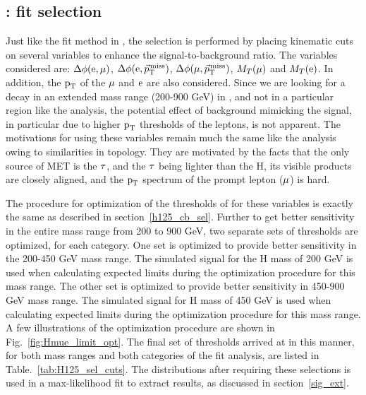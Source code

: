 \subsection{\Hmue: \mcol fit selection}
\label{H125_cb_sel}
 Just like the \mcol fit method in \hmue, the selection is performed by placing kinematic cuts on several variables to enhance the signal-to-background ratio. The variables considered are: $\Delta\phi(\text{e}, \mu)$, $\Delta\phi(\text{e}, {\vec p}_{\mathrm{T}}^{\kern1pt\text{miss}})$, $\Delta\phi(\mu, {\vec p}_{\mathrm{T}}^{\kern1pt\text{miss}})$, $M_T(\mu)$ and $M_T(\text{e})$. In addition, the $\text{p}_\text{T}$ of the $\mu$ and $\text{e}$ are also considered. Since we are looking for a decay in an extended mass range (200-900 GeV) in \Hmue, and not in a particular region like the \hmue analysis, the potential effect of background  mimicking the signal, in particular due to higher $\text{p}_\text{T}$ thresholds of the leptons, is not apparent. The motivations for using these variables remain much the same like the \hmue analysis owing to similarities in topology. They are motivated by the facts that the only source of MET is the $\tau$, and the  $\tau$ being lighter than the H, its visible products are closely aligned, and the $\text{p}_\text{T}$ spectrum of the prompt lepton ($\mu$) is hard.

The procedure for optimization of the thresholds of for these variables is exactly the same as described in section~\ref{h125_cb_sel}. Further to get better sensitivity in the entire mass range from 200 to 900 GeV, two separate sets of thresholds are optimized, for each category. One set is optimized to provide better sensitivity in the 200-450 GeV mass range. The simulated signal for the H mass of 200 GeV is used when calculating expected limits during the optimization procedure for this mass range. The other set is optimized to provide better sensitivity in 450-900 GeV mass range. The simulated signal for H mass of 450 GeV is used when calculating expected limits during the optimization procedure for this mass range. A few illustrations of the optimization procedure are shown in Fig.~\ref{fig:Hmue_limit_opt}. The final set of thresholds arrived at in this manner, for both mass ranges and both categories of the \Hmue \mcol fit analysis, are listed in Table.~\ref{tab:H125_sel_cuts}. The \mcol distributions after requiring these selections is used in a max-likelihood fit to extract results, as discussed in section~\ref{sig_ext}.


